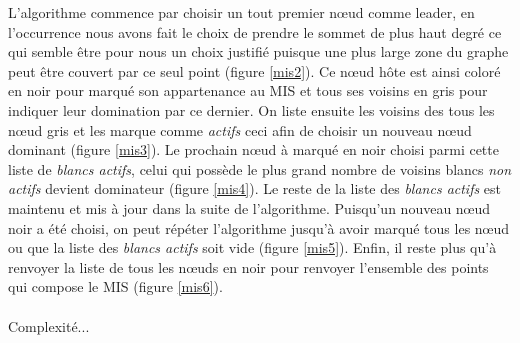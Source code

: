 \newpage
L'algorithme commence par choisir un tout premier nœud comme leader, en l'occurrence nous avons fait le choix de prendre le sommet de plus haut degré ce qui semble être pour nous un choix justifié puisque une plus large zone du graphe peut être couvert par ce seul point (figure \ref{mis2}). Ce nœud hôte est ainsi coloré en noir pour marqué son appartenance au MIS et tous ses voisins en gris pour indiquer leur domination par ce dernier. On liste ensuite les voisins des tous les nœud gris et les marque comme \textit{actifs} ceci afin de choisir un nouveau nœud dominant (figure \ref{mis3}). Le prochain nœud à marqué en noir choisi parmi cette liste de \textit{blancs actifs}, celui qui possède le plus grand nombre de voisins blancs \textit{non actifs} devient dominateur (figure \ref{mis4}). Le reste de la liste des \textit{blancs actifs} est maintenu et mis à jour dans la suite de l'algorithme. Puisqu'un nouveau nœud noir a été choisi, on peut répéter l'algorithme jusqu'à avoir marqué tous les nœud ou que la liste des \textit{blancs actifs} soit vide (figure \ref{mis5}). Enfin, il reste plus qu'à renvoyer la liste de tous les nœuds en noir pour renvoyer l'ensemble des points qui compose le MIS (figure \ref{mis6}).

\paragraph{}
Complexité...